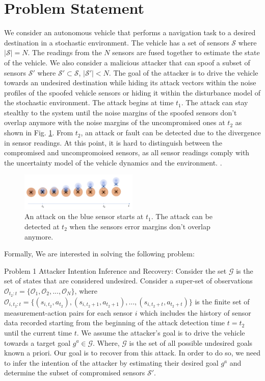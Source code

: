 \documentclass[conference]{IEEEtran}
\begin{document}
\section{Problem Statement}\label{sec:problem}
We consider an autonomous vehicle that performs a navigation task to a desired destination in a stochastic environment. The vehicle has a set of sensors $\mathcal{S}$ where $|\mathcal{S}|=N$. The readings from the $N$ sensors are fused together to estimate the state of the vehicle. We also consider a malicious attacker that can spoof a subset of sensors $\mathcal{S'}$ where $\mathcal{S'} \subset \mathcal{S}$, $|\mathcal{S'}| < N$. The goal of the attacker is to drive the vehicle towards an undesired destination while hiding its attack vectors within the noise profiles of the spoofed vehicle sensors or hiding it within the disturbance model of the stochastic environment. The attack begins at time $t_1$. The attack can stay stealthy to the system until the noise margins of the spoofed sensors don't overlap anymore with the noise margins of the uncompromised ones at $t_2$ as shown in Fig. \ref{fig:sensor_spoofing}. From $t_2$, an attack or fault can be detected due to the divergence in sensor readings. At this point, it is hard to distinguish between the compromised and uncompromoised sensors, as all sensor readings comply with the uncertainty model of the vehicle dynamics and the environment. .
\begin{figure}[h]
\centering
\includegraphics[width=0.5\textwidth]{sensor_spoofing}
\caption{An attack on the blue sensor starts at $t_1$. The attack can be detected at $t_2$ when the sensors error margins don't overlap anymore.}
 \label{fig:sensor_spoofing}
\end{figure}
Formally, We are interested in solving the following problem:

Problem 1 Attacker Intention Inference and Recovery: Consider the set $\mathcal{G}$ is the set of states that are considered undesired. Consider a super-set of observations $\mathcal{O}_{t_2:t} = \{\mathcal{O}_1, \mathcal{O}_2, ..., \mathcal{O}_N\}$, where $\mathcal{O}_{i,t_2:t} = \{(s_{i,t_2}, a_{t_2}), (s_{i,t_2+1}, a_{t_2+1}), ..., (s_{i,t_2+t}, a_{t_2+t})\}$ is the finite set of measurement-action pairs for each sensor $i$ which includes the history of sensor data recorded starting from the beginning of the attack detection time  $t = t_2$ until the current time $t$. We assume the attacker's goal is to drive the vehicle towards a target goal $g^a \in \mathcal{G}$. Where, $\mathcal{G}$ is the set of all possible undesired goals known a priori. Our goal is to recover from this attack. In order to do so, we need to infer the intention of the attacker by estimating their desired goal $g^a$ and determine the subset of compromised sensors $\mathcal{S'}$. 
\end{document}
